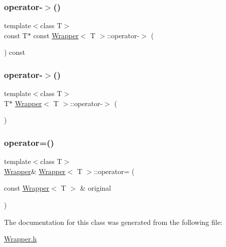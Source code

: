 \hypertarget{classWrapper_a099533e544d12652e9050f0db51c8bd3}{}\label{classWrapper_a099533e544d12652e9050f0db51c8bd3} 
\subsubsection{\texorpdfstring{operator-\/$>$()}{operator->()}\hspace{0.1cm}{\footnotesize\ttfamily [1/2]}}
{\footnotesize\ttfamily template$<$class T$>$ \\
const T$\ast$ const \hyperlink{classWrapper}{Wrapper}$<$ T $>$\+::operator-\/$>$ (\begin{DoxyParamCaption}{ }\end{DoxyParamCaption}) const\hspace{0.3cm}{\ttfamily [inline]}}

\hypertarget{classWrapper_a44a92ec32cd70089debea7205b2cc0a8}{}\label{classWrapper_a44a92ec32cd70089debea7205b2cc0a8} 
\subsubsection{\texorpdfstring{operator-\/$>$()}{operator->()}\hspace{0.1cm}{\footnotesize\ttfamily [2/2]}}
{\footnotesize\ttfamily template$<$class T$>$ \\
T$\ast$ \hyperlink{classWrapper}{Wrapper}$<$ T $>$\+::operator-\/$>$ (\begin{DoxyParamCaption}{ }\end{DoxyParamCaption})\hspace{0.3cm}{\ttfamily [inline]}}

\hypertarget{classWrapper_a8c19573051f3bbe811393abb3691147c}{}\label{classWrapper_a8c19573051f3bbe811393abb3691147c} 
\subsubsection{\texorpdfstring{operator=()}{operator=()}}
{\footnotesize\ttfamily template$<$class T$>$ \\
\hyperlink{classWrapper}{Wrapper}\& \hyperlink{classWrapper}{Wrapper}$<$ T $>$\+::operator= (\begin{DoxyParamCaption}\item[{const \hyperlink{classWrapper}{Wrapper}$<$ T $>$ \&}]{original }\end{DoxyParamCaption})\hspace{0.3cm}{\ttfamily [inline]}}



The documentation for this class was generated from the following file\+:\begin{DoxyCompactItemize}
\item 
\hyperlink{Wrapper_8h}{Wrapper.\+h}\end{DoxyCompactItemize}
